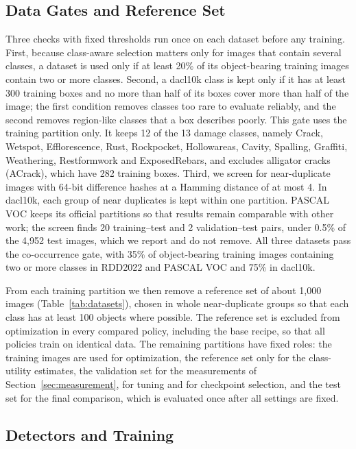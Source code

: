 \documentclass[conference]{IEEEtran}
\begin{document}
\subsection{Data Gates and Reference Set}
\label{sec:setup_gates}

Three checks with fixed thresholds run once on each dataset before any training. First, because class-aware selection matters only for images that contain several classes, a dataset is used only if at least 20\% of its object-bearing training images contain two or more classes. Second, a dacl10k class is kept only if it has at least 300 training boxes and no more than half of its boxes cover more than half of the image; the first condition removes classes too rare to evaluate reliably, and the second removes region-like classes that a box describes poorly. This gate uses the training partition only. It keeps 12 of the 13 damage classes, namely Crack, Wetspot, Efflorescence, Rust, Rockpocket, Hollowareas, Cavity, Spalling, Graffiti, Weathering, Restformwork and ExposedRebars, and excludes alligator cracks (ACrack), which have 282 training boxes. Third, we screen for near-duplicate images with 64-bit difference hashes at a Hamming distance of at most 4. In dacl10k, each group of near duplicates is kept within one partition. PASCAL VOC keeps its official partitions so that results remain comparable with other work; the screen finds 20 training--test and 2 validation--test pairs, under 0.5\% of the 4,952 test images, which we report and do not remove. All three datasets pass the co-occurrence gate, with 35\% of object-bearing training images containing two or more classes in RDD2022 and PASCAL VOC and 75\% in dacl10k.

From each training partition we then remove a reference set of about 1,000 images (Table~\ref{tab:datasets}), chosen in whole near-duplicate groups so that each class has at least 100 objects where possible. The reference set is excluded from optimization in every compared policy, including the base recipe, so that all policies train on identical data. The remaining partitions have fixed roles: the training images are used for optimization, the reference set only for the class-utility estimates, the validation set for the measurements of Section~\ref{sec:measurement}, for tuning and for checkpoint selection, and the test set for the final comparison, which is evaluated once after all settings are fixed.

\subsection{Detectors and Training}
\label{sec:setup_training}
\end{document}
